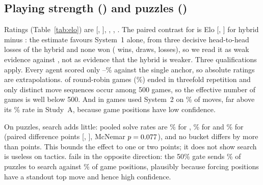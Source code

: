 \subsection{Playing strength (\Hsix{}) and puzzles (\Hfive{})}
\label{sec:studyb}
\begin{table}[t]
\centering
\caption{Study~B ratings on the anchor's nominal scale, pooled over all 500 games (anchor 1320 fixed). Each agent played 200 games; the last column is its score in the 50 games against the anchor (Wilson interval).}
\label{tab:elo}
\small

\end{table}
Ratings (Table~\ref{tab:elo}) are  \eloLaya{} [\eloLayaLo, \eloLayaHi],  \eloAlw{},  \eloHyb{},  \eloMu{}. The paired contrast for \Hsix{} is \eDHL{} Elo [\eDHLLo, \eDHLHi] for hybrid minus : the estimate favours System~1 alone, from three decisive head-to-head losses of the hybrid and none won (\hhWins{} wins, \hhDraws{} draws, \hhLosses{} losses), so we read it as weak evidence against \Hsix{}, not as evidence that the hybrid is weaker. Three qualifications apply. Every agent scored only \ancMu--\ancLaya\% against the single anchor, so absolute ratings are extrapolations. \rrThree{} of \rrN{} round-robin games (\rrThreePct\%) ended in threefold repetition and only \nUniqSeq{} distinct move sequences occur among 500 games, so the effective number of games is well below 500. And in games  used System~2 on \hybSysShare\% of moves, far above its \rateFifty\% rate in Study~A, because game positions have low confidence.

On puzzles, search adds little: pooled solve rates are \puzPoolLaya\% for , \puzPoolHyb\% for  and \puzPoolAlw\% for  (paired difference \puzDAlw{} points [\puzDAlwLo, \puzDAlwHi], McNemar $p=0.077$), and no bucket differs by more than \puzMaxBucket{} points. This bounds the effect to one or two points; it does not show search is useless on tactics. \Hfive{} fails in the opposite direction: the 50\% gate sends \trigPuz\% of puzzles to search against \trigGames\% of game positions, plausibly because forcing positions have a standout top move and hence high confidence.

